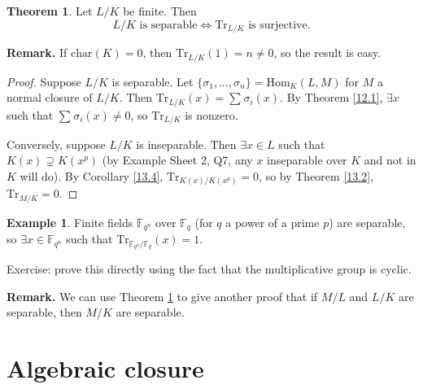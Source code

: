 \documentclass{article}
\theoremstyle{definition}
\newtheorem{theorem}{Theorem}[section]
\newtheorem{example}{Example}[section]
\begin{document}
\begin{theorem}\label{13.6}
    Let $L/K$ be finite. Then \[
    L/K \text{ is separable} \iff \text{Tr}_{L/K} \text{ is surjective.}
    \]
\end{theorem}
\textbf{Remark.} If $\text{char}(K)=0$, then $\text{Tr}_{L/K}(1)=n \neq 0$, so the result is easy.
\begin{proof}
    Suppose $L/K$ is separable. Let $\{\sigma_1,\ldots,\sigma_n\} = \text{Hom}_K(L,M)$ for $M$ a normal closure of $L/K$. Then $\text{Tr}_{L/K}(x) = \sum_{}^{} \sigma_i(x).$ By Theorem \ref{12.1}, $\exists x$ such that $\sum_{}^{} \sigma_i(x) \neq 0$, so $\text{Tr}_{L/K}$ is nonzero.
    \vspace{1mm}
    
    Conversely, suppose $L/K$ is inseparable. Then $\exists x \in L$ such that $K(x) \supsetneq K(x^p)$ (by Example Sheet 2, Q7, any $x$ inseparable over $K$ and not in $K$ will do). By Corollary \ref{13.4}, $\text{Tr}_{K(x)/K(x^p)} = 0$, so by Theorem \ref{13.2}, $\text{Tr}_{M/K}=0$.
\end{proof}
\begin{example}
    Finite fields $\mathbb{F}_{q^n}$ over $\mathbb{F}_q$ (for $q$ a power of a prime $p$) are separable, so $\exists x \in \mathbb{F}_{q^n}$ such that $\text{Tr}_{\mathbb{F}_{q^n}/\mathbb{F}_q}(x)=1$. 
    \vspace{1mm}
    
    Exercise: prove this directly using the fact that the multiplicative group is cyclic.
\end{example}
\textbf{Remark.} We can use Theorem \ref{13.6} to give another proof that if $M/L$ and $L/K$ are separable, then $M/K$ are separable.

\section{Algebraic closure}
\end{document}
